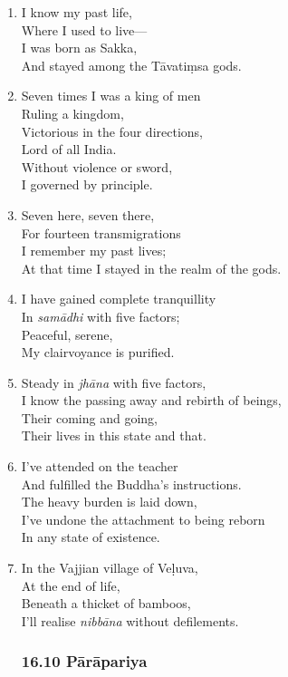 \documentclass[10pt, openany]{book}
\begin{document}
\begin{enumerate}
\item I know my past life,\\
Where I used to live—\\
I was born as Sakka,\\
And stayed among the Tāvatiṃsa gods.

\item Seven times I was a king of men\\
Ruling a kingdom,\\
Victorious in the four directions,\\
Lord of all India.\\
Without violence or sword,\\
I governed by principle.

\item Seven here, seven there,\\
For fourteen transmigrations\\
I remember my past lives;\\
At that time I stayed in the realm of the gods.

\item I have gained complete tranquillity\\
In \emph{samādhi} with five factors;\\
Peaceful, serene,\\
My clairvoyance is purified.

\item Steady in \emph{jhāna} with five factors,\\
I know the passing away and rebirth of beings,\\
Their coming and going,\\
Their lives in this state and that.

\item I’ve attended on the teacher\\
And fulfilled the Buddha’s instructions.\\
The heavy burden is laid down,\\
I’ve undone the attachment to being reborn \\
In any state of existence.

\item In the Vajjian village of Veḷuva,\\
At the end of life,\\
Beneath a thicket of bamboos,\\
I’ll realise \emph{nibbāna} without defilements.

\subsubsection*{16.10 Pārāpariya}


\end{enumerate}
\end{document}
